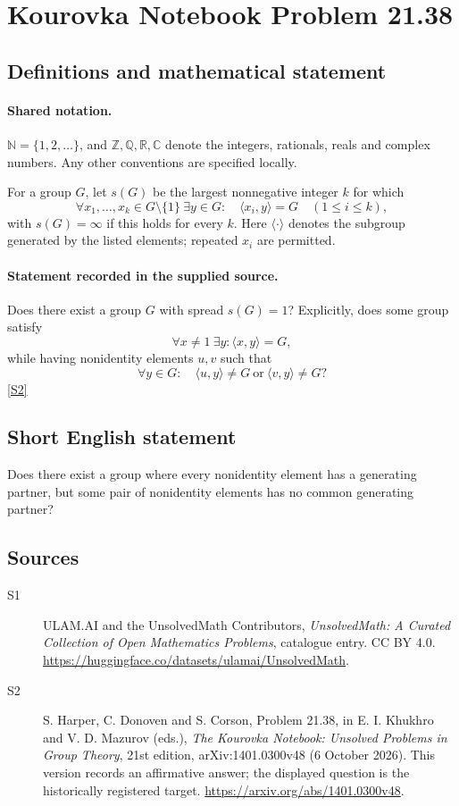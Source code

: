 \documentclass[11pt]{article}
\newcommand{\sref}[2]{\hyperlink{source:#1:#2}{[S#2]}}
\begin{document}
\section{Kourovka Notebook Problem 21.38}\label{statement}

\subsection{Definitions and mathematical statement}

\paragraph{Shared notation.}$\mathbb N=\{1,2,\ldots\}$, and $\mathbb Z,\mathbb Q,\mathbb R,\mathbb C$ denote the integers, rationals, reals and complex numbers. Any other conventions are specified locally.


For a group $G$, let $s(G)$ be the largest nonnegative integer $k$ for which
\[
 \forall x_1,\ldots,x_k\in G\setminus\{1\}\ \exists y\in G:\quad
 \langle x_i,y\rangle=G\quad(1\leq i\leq k),
\]
with $s(G)=\infty$ if this holds for every $k$. Here $\langle\cdot\rangle$ denotes the subgroup generated by the listed elements; repeated $x_i$ are permitted.
\paragraph{Statement recorded in the supplied source.}
Does there exist a group $G$ with spread $s(G)=1$? Explicitly, does some group satisfy
\[
 \forall x\ne1\ \exists y:\langle x,y\rangle=G,
\]
while having nonidentity elements $u,v$ such that
\[
 \forall y\in G:\quad \langle u,y\rangle\ne G\ \text{or}\ \langle v,y\rangle\ne G?
\] \sref{statement}{2}
\subsection{Short English statement}
Does there exist a group where every nonidentity element has a generating partner, but some pair of nonidentity elements has no common generating partner?
\subsection{Sources}
\begin{description}
\item[\hypertarget{source:statement:1}{S1}] ULAM.AI and the UnsolvedMath Contributors, \emph{UnsolvedMath: A Curated Collection of Open Mathematics Problems}, catalogue entry. CC BY 4.0. \url{https://huggingface.co/datasets/ulamai/UnsolvedMath}.
\item[\hypertarget{source:statement:2}{S2}] S. Harper, C. Donoven and S. Corson, Problem 21.38, in E. I. Khukhro and V. D. Mazurov (eds.), \emph{The Kourovka Notebook: Unsolved Problems in Group Theory}, 21st edition, arXiv:1401.0300v48 (6 October 2026). This version records an affirmative answer; the displayed question is the historically registered target. \url{https://arxiv.org/abs/1401.0300v48}.
\end{description}
\label{end:statement}
\end{document}
